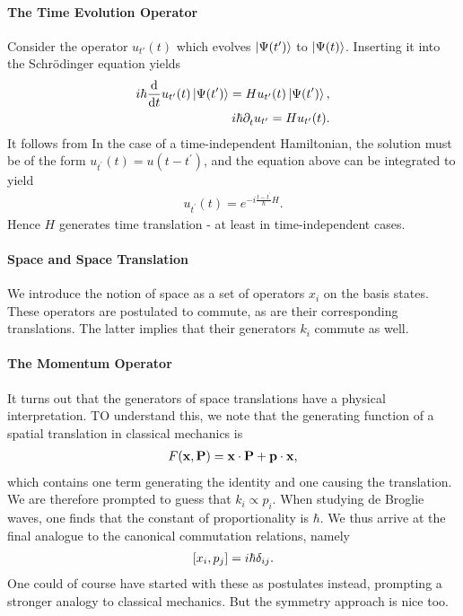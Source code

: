 \paragraph{The Time Evolution Operator}
Consider the operator $u_{t'}(t)$ which evolves $\ket{\Psi(t')}$ to $\ket{\Psi(t)}$. Inserting it into the Schrödinger equation yields
\begin{align*}
	i\hbar\dv{t}u_{t^{\prime}}(t)\ket{\Psi(t^{\prime})} = Hu_{t^{\prime}}(t)\ket{\Psi(t^{\prime})}, \\
	i\hbar\partial_{t}^{}u_{t^{\prime}} = Hu_{t^{\prime}}(t).
\end{align*}
It follows from In the case of a time-independent Hamiltonian, the solution must be of the form $u_{t^{\prime}}(t) = u(t - t^{\prime})$, and the equation above can be integrated to yield
\begin{align*}
	u_{t^{\prime}}(t) = e^{-i\frac{t - t^{\prime}}{\hbar}H}.
\end{align*}
Hence $H$ generates time translation - at least in time-independent cases.

\paragraph{Space and Space Translation}
We introduce the notion of space as a set of operators $x_{i}$ on the basis states. These operators are postulated to commute, as are their corresponding translations. The latter implies that their generators $k_{i}$ commute as well.

\paragraph{The Momentum Operator}
It turns out that the generators of space translations have a physical interpretation. TO understand this, we note that the generating function of a spatial translation in classical mechanics is
\begin{align*}
	F(\vb{x}, \vb{P}) = \vb{x}\cdot\vb{P} + \vb{p}\cdot\vb{x},
\end{align*}
which contains one term generating the identity and one causing the translation. We are therefore prompted to guess that $k_{i} \propto p_{i}$. When studying de Broglie waves, one finds that the constant of proportionality is $\hbar$. We thus arrive at the final analogue to the canonical commutation relations, namely
\begin{align*}
	\comm{x_{i}}{p_{j}} = i\hbar\delta_{ij}.
\end{align*}
One could of course have started with these as postulates instead, prompting a stronger analogy to classical mechanics. But the symmetry approach is nice too.

